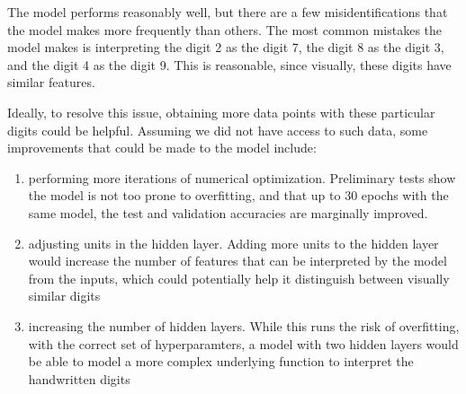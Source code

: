 \documentclass{article}
\begin{document}
The model performs reasonably well, but there are a few misidentifications that the model makes more frequently than others. The most common mistakes the model makes is interpreting the digit 2 as the digit 7, the digit 8 as the digit 3, and the digit 4 as the digit 9. This is reasonable, since visually, these digits have similar features.

Ideally, to resolve this issue, obtaining more data points with these particular digits could be helpful. Assuming we did not have access to such data, some improvements that could be made to the model include:

\begin{enumerate}
\item performing more iterations of numerical optimization. Preliminary tests show the model is not too prone to overfitting, and that up to 30 epochs with the same model, the test and validation accuracies are marginally improved.
\item adjusting units in the hidden layer. Adding more units to the hidden layer would increase the number of features that can be interpreted by the model from the inputs, which could potentially help it distinguish between visually similar digits
\item increasing the number of hidden layers. While this runs the risk of overfitting, with the correct set of hyperparamters, a model with two hidden layers would be able to model a more complex underlying function to interpret the handwritten digits
\end{enumerate}
\end{document}
